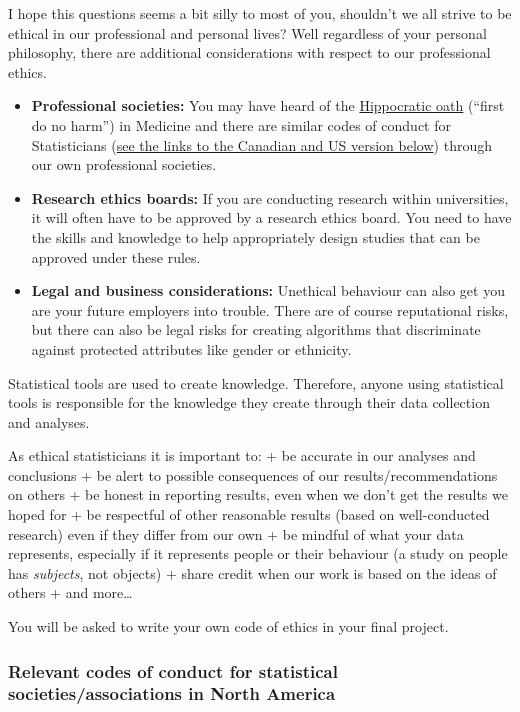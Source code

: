 \documentclass[
  openany]{book}
\begin{document}
I hope this questions seems a bit silly to most of you, shouldn't we all strive to be ethical in our professional and personal lives? Well regardless of your personal philosophy, there are additional considerations with respect to our professional ethics.

\begin{itemize}
\item
  \textbf{Professional societies:} You may have heard of the \href{https://en.wikipedia.org/wiki/Hippocratic_Oath}{Hippocratic oath} (``first do no harm'') in Medicine and there are similar codes of conduct for Statisticians (\protect\hyperlink{ethicscodes}{see the links to the Canadian and US version below}) through our own professional societies.
\item
  \textbf{Research ethics boards:} If you are conducting research within universities, it will often have to be approved by a research ethics board. You need to have the skills and knowledge to help appropriately design studies that can be approved under these rules.
\item
  \textbf{Legal and business considerations:} Unethical behaviour can also get you are your future employers into trouble. There are of course reputational risks, but there can also be legal risks for creating algorithms that discriminate against protected attributes like gender or ethnicity.
\end{itemize}

Statistical tools are used to create knowledge. Therefore, anyone using statistical tools is responsible for the knowledge they create through their data collection and analyses.

As ethical statisticians it is important to:
+ be accurate in our analyses and conclusions
+ be alert to possible consequences of our results/recommendations on others
+ be honest in reporting results, even when we don't get the results we hoped for
+ be respectful of other reasonable results (based on well-conducted research) even if they differ from our own
+ be mindful of what your data represents, especially if it represents people or their behaviour (a study on people has \emph{subjects}, not objects)
+ share credit when our work is based on the ideas of others
+ and more\ldots{}

You will be asked to write your own code of ethics in your final project.

\hypertarget{ethicscodes}{%
\subsubsection{Relevant codes of conduct for statistical societies/associations in North America}\label{ethicscodes}}
\end{document}
